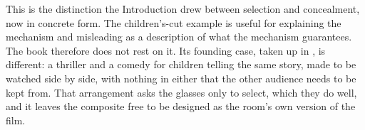 This is the distinction the Introduction drew between selection and concealment, now in concrete form. The children's-cut example is useful for explaining the mechanism and misleading as a description of what the mechanism guarantees. The book therefore does not rest on it. Its founding case, taken up in , is different: a thriller and a comedy for children telling the same story, made to be watched side by side, with nothing in either that the other audience needs to be kept from. That arrangement asks the glasses only to select, which they do well, and it leaves the composite free to be designed as the room's own version of the film.
